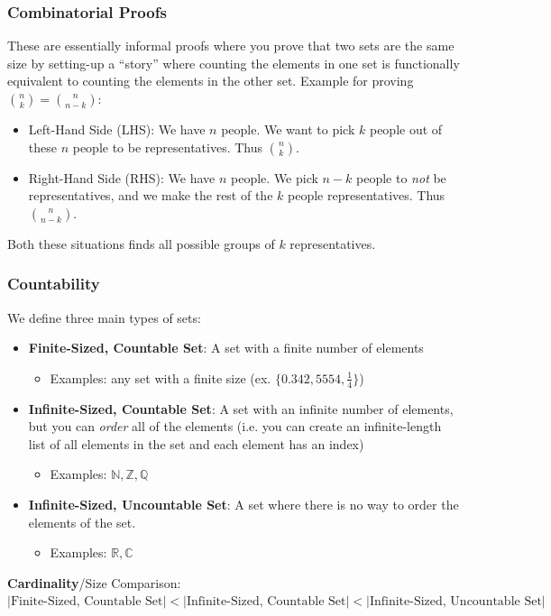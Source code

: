 \documentclass{beamer}
\begin{document}
\begin{frame}
    \frametitle{Combinatorial Proofs}
    These are essentially informal proofs where you prove that two sets are the same size by setting-up a ``story'' where counting the elements in one set is functionally equivalent to counting the elements in the other set. Example for proving $\binom{n}{k}=\binom{n}{n-k}$:
    \begin{itemize}
        \item Left-Hand Side (LHS): We have $n$ people. We want to pick $k$ people out of these $n$ people to be representatives. Thus $\binom{n}{k}$.
        \item Right-Hand Side (RHS): We have $n$ people. We pick $n-k$ people to {\it not} be representatives, and we make the rest of the $k$ people representatives. Thus $\binom{n}{n-k}$.
    \end{itemize}
    Both these situations finds all possible groups of $k$ representatives.
\end{frame}

\begin{frame}
    \frametitle{Countability}
    We define three main types of sets:
    \begin{itemize}
        \item {\bf Finite-Sized, Countable Set}: A set with a finite number of elements
        \begin{itemize}
            \item Examples: any set with a finite size (ex. $\{0.342,5554,\frac{1}{4}\}$)
        \end{itemize}
        \item {\bf Infinite-Sized, Countable Set}: A set with an infinite number of elements, but you can {\it order} all of the elements (i.e. you can create an infinite-length list of all elements in the set and each element has an index)
        \begin{itemize}
            \item Examples: $\mathbb{N},\mathbb{Z},\mathbb{Q}$
        \end{itemize}
        \item {\bf Infinite-Sized, Uncountable Set}: A set where there is no way to order the elements of the set.
        \begin{itemize}
            \item Examples: $\mathbb{R},\mathbb{C}$
        \end{itemize}
    \end{itemize}
    {\bf Cardinality}/Size Comparison: $|\text{Finite-Sized, Countable Set}|<|\text{Infinite-Sized, Countable Set}|<|\text{Infinite-Sized, Uncountable Set}|$
\end{frame}
\end{document}
